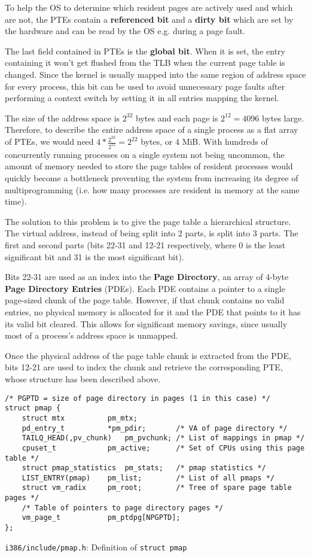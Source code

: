 \documentclass[shortabstract, english]{iithesis}
\begin{document}
To help the OS to determine which resident pages are actively used and which are
not, the PTEs contain a \textbf{referenced bit} and a \textbf{dirty bit} which
are set by the hardware and can be read by the OS e.g. during a page fault.

The last field contained in PTEs is the \textbf{global bit}. When it is set, the
entry containing it won't get flushed from the TLB when the current page table
is changed. Since the kernel is usually mapped into the same region of address
space for every process, this bit can be used to avoid unnecessary page faults
after performing a context switch by setting it in all entries mapping the
kernel.

The size of the address space is $2^{32}$ bytes and each page is $2^{12} = 4096$
bytes large. Therefore, to describe the entire address space of a single process
as a flat array of PTEs, we would need $4 * \frac{2^{32}}{2^{12}} = 2^{22}$
bytes, or $4$ MiB. With hundreds of concurrently running processes on a single
system not being uncommon, the amount of memory needed to store the page tables
of resident processes would quickly become a bottleneck preventing the system
from increasing its degree of multiprogramming (i.e. how many processes are
resident in memory at the same time).

The solution to this problem is to give the page table a hierarchical structure.
The virtual address, instead of being split into 2 parts, is split into 3 parts.
The first and second parts (bits 22-31 and 12-21 respectively, where 0 is the
least significant bit and 31 is the most significant bit).

Bits 22-31 are used as an index into the \textbf{Page Directory}, an array of
4-byte \textbf{Page Directory Entries} (PDEs). Each PDE contains a pointer to a
single page-sized chunk of the page table. However, if that chunk contains no
valid entries, no physical memory is allocated for it and the PDE that points to
it has its valid bit cleared. This allows for significant memory savings, since
usually most of a process's address space is unmapped.

Once the physical address of the page table chunk is extracted from the PDE,
bits 12-21 are used to index the chunk and retrieve the corresponding PTE, whose
structure has been described above.

\begin{listing}[H]
\begin{verbatim}
/* PGPTD = size of page directory in pages (1 in this case) */
struct pmap {
    struct mtx          pm_mtx;
    pd_entry_t          *pm_pdir;       /* VA of page directory */
    TAILQ_HEAD(,pv_chunk)   pm_pvchunk; /* List of mappings in pmap */
    cpuset_t            pm_active;      /* Set of CPUs using this page table */
    struct pmap_statistics  pm_stats;   /* pmap statistics */
    LIST_ENTRY(pmap)    pm_list;        /* List of all pmaps */
    struct vm_radix     pm_root;        /* Tree of spare page table pages */
    /* Table of pointers to page directory pages */
    vm_page_t           pm_ptdpg[NPGPTD];
};
\end{verbatim}
\caption{\texttt{i386/include/pmap.h}: Definition of \texttt{struct pmap}}
\end{listing}
\end{document}
